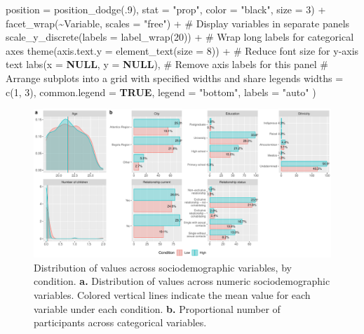 \documentclass[
  bookmarksnumbered]{article}
\newenvironment{Shaded}{\begin{snugshade}}{\end{snugshade}}
\newcommand{\AttributeTok}[1]{\textcolor[rgb]{0.80,0.80,0.80}{#1}}
\newcommand{\CommentTok}[1]{\textcolor[rgb]{0.50,0.62,0.50}{#1}}
\newcommand{\ConstantTok}[1]{\textcolor[rgb]{0.86,0.64,0.64}{\textbf{#1}}}
\newcommand{\DecValTok}[1]{\textcolor[rgb]{0.86,0.86,0.80}{#1}}
\newcommand{\FunctionTok}[1]{\textcolor[rgb]{0.94,0.94,0.56}{#1}}
\newcommand{\NormalTok}[1]{\textcolor[rgb]{0.80,0.80,0.80}{#1}}
\newcommand{\SpecialCharTok}[1]{\textcolor[rgb]{0.86,0.64,0.64}{#1}}
\newcommand{\StringTok}[1]{\textcolor[rgb]{0.80,0.58,0.58}{#1}}
\begin{document}
\begin{Shaded}
\begin{Highlighting}[]
              \AttributeTok{position =} \FunctionTok{position\_dodge}\NormalTok{(.}\DecValTok{9}\NormalTok{),}
              \AttributeTok{stat =} \StringTok{"prop"}\NormalTok{,}
              \AttributeTok{color =} \StringTok{"black"}\NormalTok{,}
              \AttributeTok{size =} \DecValTok{3}\NormalTok{) }\SpecialCharTok{+}
    \FunctionTok{facet\_wrap}\NormalTok{(}\SpecialCharTok{\textasciitilde{}}\NormalTok{Variable, }\AttributeTok{scales =} \StringTok{"free"}\NormalTok{) }\SpecialCharTok{+}  \CommentTok{\# Display variables in separate panels}
    \FunctionTok{scale\_y\_discrete}\NormalTok{(}\AttributeTok{labels =} \FunctionTok{label\_wrap}\NormalTok{(}\DecValTok{20}\NormalTok{)) }\SpecialCharTok{+}  \CommentTok{\# Wrap long labels for categorical axes}
    \FunctionTok{theme}\NormalTok{(}\AttributeTok{axis.text.y =} \FunctionTok{element\_text}\NormalTok{(}\AttributeTok{size =} \DecValTok{8}\NormalTok{)) }\SpecialCharTok{+}  \CommentTok{\# Reduce font size for y{-}axis text}
    \FunctionTok{labs}\NormalTok{(}\AttributeTok{x =} \ConstantTok{NULL}\NormalTok{, }\AttributeTok{y =} \ConstantTok{NULL}\NormalTok{),  }\CommentTok{\# Remove axis labels for this panel}
  \CommentTok{\# Arrange subplots into a grid with specified widths and share legends}
  \AttributeTok{widths =} \FunctionTok{c}\NormalTok{(}\DecValTok{1}\NormalTok{, }\DecValTok{3}\NormalTok{),}
  \AttributeTok{common.legend =} \ConstantTok{TRUE}\NormalTok{,}
  \AttributeTok{legend =} \StringTok{"bottom"}\NormalTok{,}
  \AttributeTok{labels =} \StringTok{"auto"}
\NormalTok{)}
\end{Highlighting}
\end{Shaded}

\begin{figure}
\centering
\includegraphics{Supplementary_material_files/figure-latex/sociodemographic-desc-plot-1.pdf}
\caption{\label{fig:sociodemographic-desc-plot}Distribution of values across sociodemographic variables, by condition. \textbf{a.} Distribution of values across numeric sociodemographic variables. Colored vertical lines indicate the mean value for each variable under each condition. \textbf{b.} Proportional number of participants across categorical variables.}
\end{figure}
\end{document}
